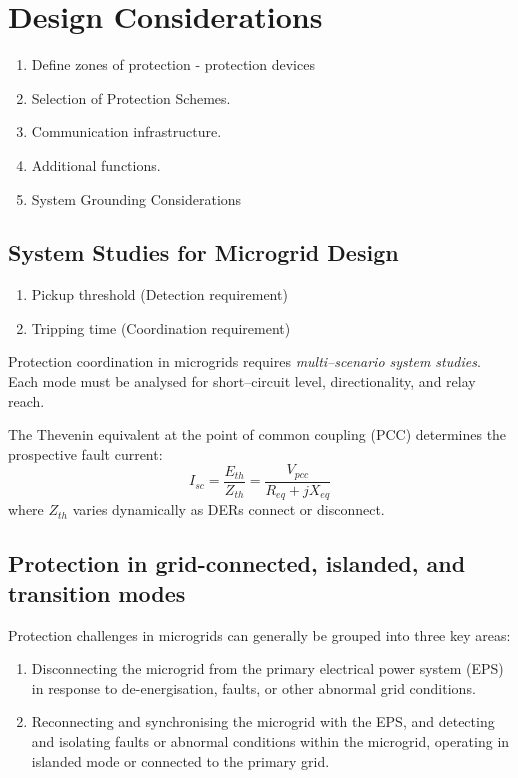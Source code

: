 






\section{Design Considerations}


\begin{enumerate}
	\item Define zones of protection - protection devices

	 \item Selection of Protection Schemes.
      \item Communication infrastructure.
    \item  Additional functions. 
    \item System Grounding Considerations

\end{enumerate}

\subsection{System Studies for Microgrid Design}

\begin{enumerate}
	\item Pickup threshold (Detection requirement)
	 \item Tripping time (Coordination requirement)
\end{enumerate}


Protection coordination in microgrids requires \textit{multi–scenario system studies}.  
Each mode must be analysed for short–circuit level, directionality, and relay reach.

The Thevenin equivalent at the point of common coupling (PCC) determines the prospective fault current:
\begin{equation}
I_{sc} = \frac{E_{th}}{Z_{th}} = \frac{V_{pcc}}{R_{eq} + j X_{eq}}
\label{eq:isc}
\end{equation}
where $Z_{th}$ varies dynamically as DERs connect or disconnect. 

\subsection{Protection in grid-connected, islanded, and transition modes}
Protection challenges in microgrids can generally be grouped into three key areas:
\begin{enumerate}
    \item Disconnecting the microgrid from the primary electrical power system (EPS) in response to de-energisation, faults, or other abnormal grid conditions.
    \item Reconnecting and synchronising the microgrid with the EPS, and detecting and isolating faults or abnormal conditions within the microgrid, operating in islanded mode or connected to the primary grid.
\end{enumerate}


